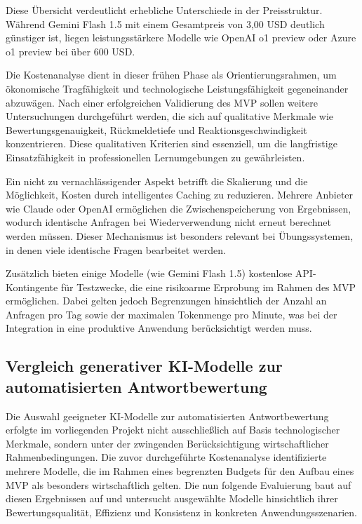 \documentclass[a4paper,12pt]{article}
\begin{document}
Diese Übersicht verdeutlicht erhebliche Unterschiede in der Preisstruktur. Während Gemini Flash 1.5 mit einem Gesamtpreis von 3,00 USD deutlich günstiger ist, liegen leistungsstärkere Modelle wie OpenAI o1 preview oder Azure o1 preview bei über 600 USD.

Die Kostenanalyse dient in dieser frühen Phase als Orientierungsrahmen, um ökonomische Tragfähigkeit und technologische Leistungsfähigkeit gegeneinander abzuwägen. Nach einer erfolgreichen Validierung des MVP sollen weitere Untersuchungen durchgeführt werden, die sich auf qualitative Merkmale wie Bewertungsgenauigkeit, Rückmeldetiefe und Reaktionsgeschwindigkeit konzentrieren. Diese qualitativen Kriterien sind essenziell, um die langfristige Einsatzfähigkeit in professionellen Lernumgebungen zu gewährleisten.

Ein nicht zu vernachlässigender Aspekt betrifft die Skalierung und die Möglichkeit, Kosten durch intelligentes Caching zu reduzieren. Mehrere Anbieter wie Claude oder OpenAI ermöglichen die Zwischenspeicherung von Ergebnissen, wodurch identische Anfragen bei Wiederverwendung nicht erneut berechnet werden müssen. Dieser Mechanismus ist besonders relevant bei Übungssystemen, in denen viele identische Fragen bearbeitet werden.

Zusätzlich bieten einige Modelle (wie Gemini Flash 1.5) kostenlose API-Kontingente für Testzwecke, die eine risikoarme Erprobung im Rahmen des MVP ermöglichen. Dabei gelten jedoch Begrenzungen hinsichtlich der Anzahl an Anfragen pro Tag sowie der maximalen Tokenmenge pro Minute, was bei der Integration in eine produktive Anwendung berücksichtigt werden muss.

\newpage

\subsection{Vergleich generativer KI-Modelle zur automatisierten Antwortbewertung}
Die Auswahl geeigneter KI-Modelle zur automatisierten Antwortbewertung erfolgte im vorliegenden Projekt nicht ausschließlich auf Basis technologischer Merkmale, sondern unter der zwingenden Berücksichtigung wirtschaftlicher Rahmenbedingungen. Die zuvor durchgeführte Kostenanalyse identifizierte mehrere Modelle, die im Rahmen eines begrenzten Budgets für den Aufbau eines MVP als besonders wirtschaftlich gelten. Die nun folgende Evaluierung baut auf diesen Ergebnissen auf und untersucht ausgewählte Modelle hinsichtlich ihrer Bewertungsqualität, Effizienz und Konsistenz in konkreten Anwendungsszenarien.
\end{document}
